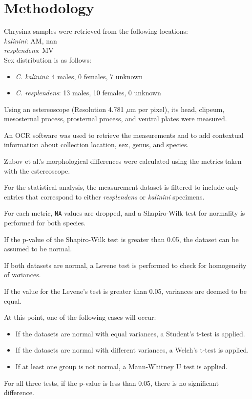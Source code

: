 \section{Methodology}

Chrysina samples were retrieved from the following locations: \\ 
\textit{kalinini}: AM, nan \\ 
\textit{resplendens}: MV \\ 

Sex distribution is as follows:
\begin{itemize}
  \item \textit{C. kalinini}: 4 males, 0 females, 7 unknown
  \item \textit{C. resplendens}: 13 males, 10 females, 0 unknown
\end{itemize}

Using an estereoscope (Resolution 4.781 $\mu$m per pixel), its head, clipeum, mesosternal process, prosternal process, and ventral plates were measured. 

An OCR software was used to retrieve the measurements and to add contextual information about collection location, sex, genus, and species. 

Zubov et al.'s morphological differences were calculated using the metrics taken with the estereoscope. 

For the statistical analysis, the measurement dataset is filtered to include only entries that correspond to either \textit{resplendens} or \textit{kalinini} specimens. 

For each metric, \texttt{NA} values are dropped, and a Shapiro-Wilk test for normality is performed for both species.

If the p-value of the Shapiro-Wilk test is greater than 0.05, the dataset can be assumed to be normal.

If both datasets are normal, a Levene test is performed to check for homogeneity of variances. 

If the value for the Levene’s test is greater than 0.05, variances are deemed to be equal.

At this point, one of the following cases will occur:

\begin{itemize}
    \item If the datasets are normal with equal variances, a Student’s t-test is applied.
    \item If the datasets are normal with different variances, a Welch’s t-test is applied.
    \item If at least one group is not normal, a Mann-Whitney U test is applied.
\end{itemize}

For all three tests, if the p-value is less than 0.05, there is no significant difference.

\newpage
